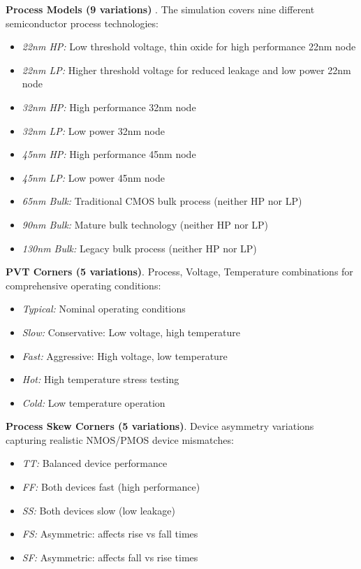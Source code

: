 \documentclass[10pt,twocolumn,letterpaper]{article}
\begin{document}
\textbf{\normalsize Process Models (9 variations)} \cite{ptm_umn_models}. The simulation covers nine different semiconductor process technologies:

\begin{itemize}[nosep]
\item \textit{22nm HP:} Low threshold voltage, thin oxide for high performance 22nm node
\item \textit{22nm LP:} Higher threshold voltage for reduced leakage and low power 22nm node
\item \textit{32nm HP:} High performance 32nm node
\item \textit{32nm LP:} Low power 32nm node
\item \textit{45nm HP:} High performance 45nm node
\item \textit{45nm LP:} Low power 45nm node
\item \textit{65nm Bulk:} Traditional CMOS bulk process (neither HP nor LP)
\item \textit{90nm Bulk:} Mature bulk technology (neither HP nor LP)
\item \textit{130nm Bulk:} Legacy bulk process (neither HP nor LP)\\
\end{itemize}

\textbf{\normalsize PVT Corners (5 variations)}. Process, Voltage, Temperature combinations for comprehensive operating conditions:

\begin{itemize}[nosep]
\item \textit{Typical:} Nominal operating conditions
\item \textit{Slow:} Conservative: Low voltage, high temperature
\item \textit{Fast:} Aggressive: High voltage, low temperature
\item \textit{Hot:} High temperature stress testing
\item \textit{Cold:} Low temperature operation\\
\end{itemize}

\textbf{\normalsize Process Skew Corners (5 variations)}. Device asymmetry variations capturing realistic NMOS/PMOS device mismatches:

\begin{itemize}[nosep]
\item \textit{TT:} Balanced device performance
\item \textit{FF:} Both devices fast (high performance)
\item \textit{SS:} Both devices slow (low leakage)
\item \textit{FS:} Asymmetric: affects rise vs fall times
\item \textit{SF:} Asymmetric: affects fall vs rise times\\
\end{itemize}
\end{document}
